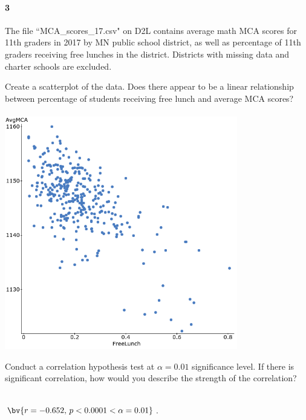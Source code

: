 \documentclass{article}
\begin{document}
\begin{flushleft}
\paragraph{3} The file ``MCA\_scores\_17.csv" on D2L contains average math MCA scores for 11th graders in 2017 by MN public school district, as well as percentage of 11th graders receiving free lunches in the district. Districts with missing data and charter schools are excluded.
\begin{enumalpha}
\item Create a scatterplot of the data. Does there appear to be a linear relationship between percentage of students receiving free lunch and average MCA scores?\\
\medskip
{}\\
\medskip
\includegraphics[width=4in]{images/grp11_Q2_a}
\vspace{.25in}

\item Conduct a correlation hypothesis test at $\alpha = 0.01$ significance level. If there is significant correlation, how would you describe the strength of the correlation?\\
\medskip
{}\\
\medskip

$\bv{r = -0.652, \, p < 0.0001 < \alpha = 0.01}$. 


\end{enumalpha}
\end{flushleft}
\end{document}

